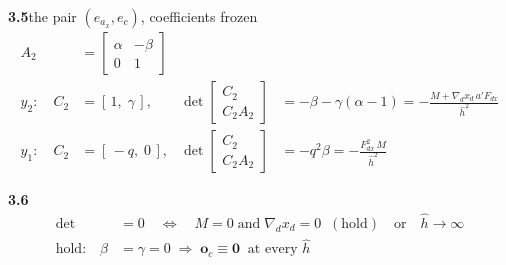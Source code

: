 \documentclass[11pt,a4paper]{ctexart}
\begin{document}
\textbf{3.5}\quad the pair $(e_{a_x}, e_c)$, coefficients frozen
\[
\begin{aligned}
A_2 &= \begin{bmatrix} \alpha & -\beta \\ 0 & 1 \end{bmatrix} \\
y_2:\quad C_2 &= [\,1,\;\gamma\,], & \det\begin{bmatrix} C_2 \\ C_2 A_2\end{bmatrix} &= -\beta - \gamma(\alpha - 1) = -\frac{M + \nabla_d x_d\,a' F_{dx}}{\hat h^{2}} \\
y_1:\quad C_2 &= [\,-q,\;0\,], & \det\begin{bmatrix} C_2 \\ C_2 A_2\end{bmatrix} &= -q^{2}\beta = -\frac{F_{dx}^{2}\,M}{\hat h^{2}}
\end{aligned}
\]

\textbf{3.6}
\[
\begin{aligned}
\det &= 0 \quad\Longleftrightarrow\quad M = 0 \;\text{and}\; \nabla_d x_d = 0 \;\;(\text{hold}) \quad\text{or}\quad \hat h \to \infty \\
\text{hold:}\quad \beta &= \gamma = 0 \;\Rightarrow\; \mathbf{o}_c \equiv \mathbf{0} \;\;\text{at every } \hat h
\end{aligned}
\]
\end{document}
